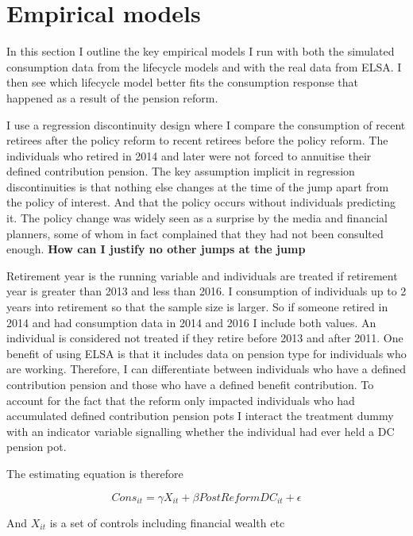 \documentclass[12pt]{article}
\begin{document}
\section{Empirical models}

In this section I outline the key empirical models I run with both the simulated consumption data from the
lifecycle models and with the real data from ELSA. I then see which lifecycle model better fits the consumption
response that happened as a result of the pension reform.

I use a regression discontinuity design where I compare the consumption of recent retirees after the policy reform
to recent retirees before the policy reform. The individuals who retired in 2014 and later were not forced to
annuitise their defined contribution pension. The key assumption implicit in regression discontinuities is
that nothing else changes at the time of the jump apart from the policy of interest. And that the policy occurs
without individuals predicting it. The policy change was widely seen as a surprise by the media and financial planners,
some of whom in fact complained that they had not been consulted enough. \textbf{How can I justify no other jumps at the jump}

Retirement year is the running variable and individuals are treated if retirement year is greater than 2013 and less than 2016.
I consumption of individuals up to 2 years into retirement so that the sample size is larger. So if someone retired in 2014 and
had consumption data in 2014 and 2016 I include both values. An individual is considered not treated if they retire before 2013 and after 2011.
One benefit of using ELSA is that it includes data on pension type for individuals who are working. Therefore, I can differentiate 
between individuals who have a defined contribution pension and those who have a defined benefit contribution. To account for the fact
that the reform only impacted individuals who had accumulated defined contribution pension pots I interact the treatment dummy with 
an indicator variable signalling whether the individual had ever held a DC pension pot. 

The estimating equation is therefore 

\begin{equation*}
  Cons_{it} =  \gamma X_{it} + \beta PostReformDC_{it} + \epsilon
\end{equation*}

And $X_{it}$ is a set of controls including financial wealth etc
\end{document}
